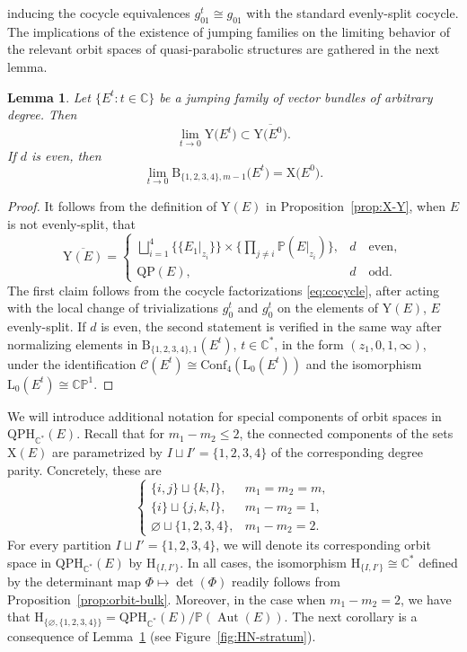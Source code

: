 \documentclass[10pt,a4paper]{amsart}
\newcommand{\field}[1]{\ensuremath{\mathbb{#1}}}
\newcommand{\CC}{\field{C}}
\newcommand{\PP}{\field{P}}
\newcommand{\curly}[1]{\mathscr{#1}}
\newcommand{\cC}{\curly{C}}
\DeclareMathOperator{\Aut}{Aut}
\numberwithin{equation}{section}
\newtheorem{Lemma}[Theorem]{Lemma}
\begin{document}
 inducing the cocycle equivalences $g^{t}_{01}\cong g_{01}$ with the standard evenly-split cocycle. The implications of the existence of jumping families on the limiting behavior of the relevant orbit spaces of quasi-parabolic structures are gathered in the next lemma.

\begin{Lemma}\label{lemma:limit}
Let $\{E^{t}\colon t\in\CC\}$ be a jumping family of vector bundles of arbitrary degree. Then
\[
\lim\limits_{t\rightarrow 0} \mathrm{Y}\big(E^{t}\big) \subset \overline{\mathrm{Y}\big(E^{0}\big)}.
\]
If $d$ is even, then
\[
\lim\limits_{t\rightarrow 0} \mathrm{B}_{\{1,2,3,4\},m-1}\big(E^{t}\big) = \mathrm{X}\big(E^{0}\big).
\]
\end{Lemma}

\begin{proof}
It follows from the definition of $\mathrm{Y}(E)$ in Proposition~\ref{prop:X-Y}, when $E$ is not evenly-split, that
\[
\overline{\mathrm{Y}(E)} =
 \begin{cases}
\displaystyle\bigsqcup_{i=1}^{4} \{\{E_{1}\vert_{z_{i}}\} \} \times \bigg\{\prod_{j\neq i}\PP(E\vert_{z_{i}}) \bigg\},& d\quad \text{even},\\
\displaystyle\mathrm{QP}(E), & d\quad \text{odd}.
\end{cases}
\]
The first claim follows from the cocycle factorizations \eqref{eq:cocycle}, after acting with the local change of trivializations $g^{t}_{0}$ and $g^{t}_{0}$ on the elements of $\mathrm{Y}(E)$, $E$ evenly-split. If $d$ is even, the second statement is verified in the same way after normalizing elements in $\mathrm{B}_{\{1,2,3,4\},1}(E^{t})$, $t\in\CC^{*}$, in the form $(z_{1},0,1,\infty)$, under the identification $\cC(E^{t})\cong \mathrm{Conf}_{4}(\mathrm{L}_{0}(E^{t}))$ and the isomorphism $\mathrm{L}_{0}(E^{t})\cong\CC\PP^{1}$.
\end{proof}

We will introduce additional notation for special components of orbit spaces in $\mathrm{QPH}_{\CC^{*}}(E)$. Recall that for $m_{1}-m_{2}\leq 2$, the connected components of the sets $\mathrm{X}(E)$ are parametrized by $I\sqcup I' = \{1,2,3,4\}$ of the corresponding degree parity. Concretely, these are
\[
 \begin{cases}
\{i,j\}\sqcup \{k,l\},& m_{1} = m_{2} = m,\\
\{i\}\sqcup\{j,k,l\}, & m_{1} - m_{2} = 1,\\
\varnothing \sqcup \{1,2,3,4\}, & m_{1} - m_{2} = 2.
\end{cases}
\]
For every partition $I\sqcup I' = \{1,2,3,4\}$, we will denote its corresponding orbit space in $\mathrm{QPH}_{\CC^{*}}(E)$ by $\mathrm{H}_{\{I,I'\}}$. In all cases, the isomorphism $\mathrm{H}_{\{I,I'\}}\cong \CC^{*}$ defined by the determinant map $\Phi\mapsto\det(\Phi)$ readily follows from Proposition~\ref{prop:orbit-bulk}. Moreover, in the case when $m_{1}-m_{2} = 2$, we have that $\mathrm{H}_{\{\varnothing ,\{1,2,3,4\}\}} = \mathrm{QPH}_{\CC^{*}}(E)/\PP(\Aut(E))$. The next corollary is a consequence of Lemma~\ref{lemma:limit} (see Figure~\ref{fig:HN-stratum}).
\end{document}
